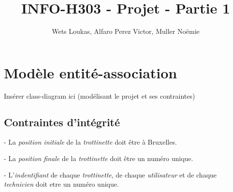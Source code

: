 \documentclass{article}
\title{INFO-H303 - Projet - Partie 1}
\author{Wets Loukas, Alfaro Perez Victor, Muller Noëmie}
\begin{document}
\maketitle

\renewcommand{\abstractname}{}


\section{Modèle entité-association}
Insérer class-diagram ici (modélisant le projet et ses contraintes)

\subsection*{Contraintes d'intégrité}

- La \textit{position initiale} de la \textit{trottinette} doit être à Bruxelles.

- La \textit{position finale} de la \textit{trottinette} doit être un numéro unique.

- L'\textit{indentifiant} de chaque \textit{trottinette}, de chaque \textit{utilisateur} et de chaque \textit{technicien} doit etre un numéro unique.
\end{document}
